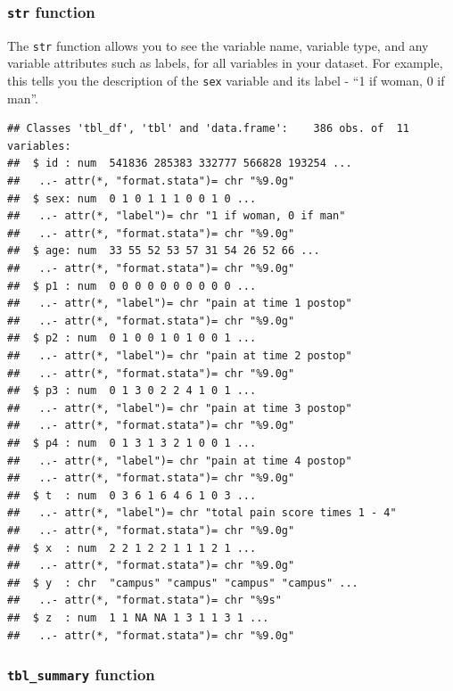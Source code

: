 \documentclass[]{book}
\newenvironment{Shaded}{\begin{snugshade}}{\end{snugshade}}
\newcommand{\KeywordTok}[1]{\textcolor[rgb]{0.13,0.29,0.53}{\textbf{#1}}}
\newcommand{\NormalTok}[1]{#1}
\newcommand{\OperatorTok}[1]{\textcolor[rgb]{0.81,0.36,0.00}{\textbf{#1}}}
\newcommand{\StringTok}[1]{\textcolor[rgb]{0.31,0.60,0.02}{#1}}
\begin{document}
\hypertarget{str-function}{%
\subsubsection{\texorpdfstring{\texttt{str} function}{str function}}\label{str-function}}

The \texttt{str} function allows you to see the variable name, variable type, and any variable attributes such as labels, for all variables in your dataset. For example, this tells you the description of the \texttt{sex} variable and its label - ``1 if woman, 0 if man''.

\begin{Shaded}
\end{Shaded}

\begin{verbatim}
## Classes 'tbl_df', 'tbl' and 'data.frame':    386 obs. of  11 variables:
##  $ id : num  541836 285383 332777 566828 193254 ...
##   ..- attr(*, "format.stata")= chr "%9.0g"
##  $ sex: num  0 1 0 1 1 1 0 0 1 0 ...
##   ..- attr(*, "label")= chr "1 if woman, 0 if man"
##   ..- attr(*, "format.stata")= chr "%9.0g"
##  $ age: num  33 55 52 53 57 31 54 26 52 66 ...
##   ..- attr(*, "format.stata")= chr "%9.0g"
##  $ p1 : num  0 0 0 0 0 0 0 0 0 0 ...
##   ..- attr(*, "label")= chr "pain at time 1 postop"
##   ..- attr(*, "format.stata")= chr "%9.0g"
##  $ p2 : num  0 1 0 0 1 0 1 0 0 1 ...
##   ..- attr(*, "label")= chr "pain at time 2 postop"
##   ..- attr(*, "format.stata")= chr "%9.0g"
##  $ p3 : num  0 1 3 0 2 2 4 1 0 1 ...
##   ..- attr(*, "label")= chr "pain at time 3 postop"
##   ..- attr(*, "format.stata")= chr "%9.0g"
##  $ p4 : num  0 1 3 1 3 2 1 0 0 1 ...
##   ..- attr(*, "label")= chr "pain at time 4 postop"
##   ..- attr(*, "format.stata")= chr "%9.0g"
##  $ t  : num  0 3 6 1 6 4 6 1 0 3 ...
##   ..- attr(*, "label")= chr "total pain score times 1 - 4"
##   ..- attr(*, "format.stata")= chr "%9.0g"
##  $ x  : num  2 2 1 2 2 1 1 1 2 1 ...
##   ..- attr(*, "format.stata")= chr "%9.0g"
##  $ y  : chr  "campus" "campus" "campus" "campus" ...
##   ..- attr(*, "format.stata")= chr "%9s"
##  $ z  : num  1 1 NA NA 1 3 1 1 3 1 ...
##   ..- attr(*, "format.stata")= chr "%9.0g"
\end{verbatim}

\hypertarget{tbl_summary-function}{%
\subsubsection{\texorpdfstring{\texttt{tbl\_summary} function}{tbl\_summary function}}\label{tbl_summary-function}}
\end{document}
